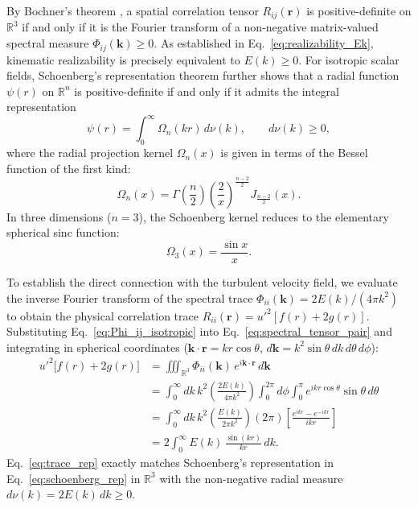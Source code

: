 \documentclass[lineno]{jfm}
\begin{document}
By Bochner's theorem \citep{Bochner1959}, a spatial correlation tensor $R_{ij}(\mathbf{r})$ is positive-definite on $\mathbb{R}^3$ if and only if it is the Fourier transform of a non-negative matrix-valued spectral measure $\Phi_{ij}(\mathbf{k}) \ge 0$. As established in Eq.~\eqref{eq:realizability_Ek}, kinematic realizability is precisely equivalent to $E(k) \ge 0$. For isotropic scalar fields, Schoenberg's representation theorem \citep{Schoenberg1938} further shows that a radial function $\psi(r)$ on $\mathbb{R}^n$ is positive-definite if and only if it admits the integral representation
\begin{equation}
\psi(r) = \int_0^\infty \Omega_n(kr)\,d\nu(k), \qquad d\nu(k) \ge 0,
\label{eq:schoenberg_rep}
\end{equation}
where the radial projection kernel $\Omega_n(x)$ is given in terms of the Bessel function of the first kind:
\begin{equation}
\Omega_n(x) = \Gamma\left(\frac{n}{2}\right) \left(\frac{2}{x}\right)^{\frac{n-2}{2}} J_{\frac{n-2}{2}}(x).
\label{eq:schoenberg_kernel_n}
\end{equation}
In three dimensions ($n=3$), the Schoenberg kernel reduces to the elementary spherical sinc function:
\begin{equation}
\Omega_3(x) = \frac{\sin x}{x}.
\label{eq:omega3_kernel}
\end{equation}

To establish the direct connection with the turbulent velocity field, we evaluate the inverse Fourier transform of the spectral trace $\Phi_{ii}(\mathbf{k}) = 2E(k)/(4\pi k^2)$ to obtain the physical correlation trace $R_{ii}(\mathbf{r}) = u'^2 [f(r) + 2g(r)]$. Substituting Eq.~\eqref{eq:Phi_ij_isotropic} into Eq.~\eqref{eq:spectral_tensor_pair} and integrating in spherical coordinates ($\mathbf{k} \cdot \mathbf{r} = kr\cos\theta$, $d\mathbf{k} = k^2\sin\theta\,dk\,d\theta\,d\phi$):
\begin{align}
u'^2 \big[ f(r) + 2g(r) \big] &= \iiint_{\mathbb{R}^3} \Phi_{ii}(\mathbf{k})\,e^{i \mathbf{k} \cdot \mathbf{r}}\,d\mathbf{k} \nonumber \\
&= \int_0^\infty dk\,k^2 \left(\frac{2 E(k)}{4\pi k^2}\right) \int_0^{2\pi} d\phi \int_0^\pi e^{i kr \cos\theta} \sin\theta\,d\theta \nonumber \\
&= \int_0^\infty dk\,k^2 \left(\frac{E(k)}{2\pi k^2}\right) (2\pi) \left[ \frac{e^{i kr} - e^{-i kr}}{i kr} \right] \nonumber \\
&= 2 \int_0^\infty E(k)\,\frac{\sin(kr)}{kr}\,dk.
\label{eq:trace_rep}
\end{align}
Eq.~\eqref{eq:trace_rep} exactly matches Schoenberg's representation in Eq.~\eqref{eq:schoenberg_rep} in $\mathbb{R}^3$ with the non-negative radial measure $d\nu(k) = 2E(k)\,dk \ge 0$.
\end{document}
